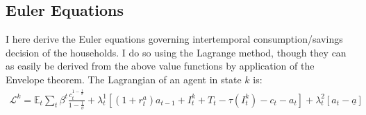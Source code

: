 \subsection{Euler Equations}
I here derive the Euler equations governing intertemporal consumption/savings decision of the households. I do so using the Lagrange method, though they can as easily be derived from the above value functions by application of the Envelope theorem. The Lagrangian of an agent in state $k$ is: 
\begin{align*}
\mathcal{L}^{k}=\mathbb{E}_{t}\sum_{t}  \beta^{t}\frac{c_{t}^{1-\frac{1}{\sigma}}}{1-\frac{1}{\sigma}}
+\lambda_{t}^{1}\left[\left(1+r^a_{t}\right)a_{t-1}+I_{t}^{k}+T_{t}-\tau\left(I_{t}^{k}\right)- c_{t}-a_{t}\right]+\lambda_{t}^{2}\left[a_{t}-\underline{a}\right]
\end{align*}

